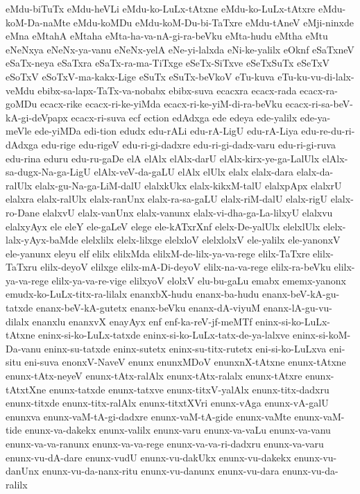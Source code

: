{eMdu-biTuTx
eMdu-heVLi
eMdu-ko-LuLx-tAtxne
eMdu-ko-LuLx-tAtxre
eMdu-koM-Da-naMte
eMdu-koMDu
eMdu-koM-Du-bi-TaTxre
eMdu-tAneV
eMji-ninxde
eMna
eMtahA
eMtaha
eMta-ha-va-nA-gi-ra-beVku
eMta-hudu
eMtha
eMtu
eNeNxya
eNeNx-ya-vanu
eNeNx-yelA
eNe-yi-lalxda
eNi-ke-yalilx
eOknf
eSaTxneV
eSaTx-neya
eSaTxra
eSaTx-ra-ma-TiTxge
eSeTx-SiTxve
eSeTxSuTx
eSeTxV
eSoTxV
eSoTxV-ma-kakx-Lige
eSuTx
eSuTx-beVkoV
eTu-kuva
eTu-ku-vu-di-lalx-veMdu
ebibx-sa-lapx-TaTx-va-nobabx
ebibx-suva
ecacxra
ecacx-rada
ecacx-ra-goMDu
ecacx-rike
ecacx-ri-ke-yiMda
ecacx-ri-ke-yiM-di-ra-beVku
ecacx-ri-sa-beV-kA-gi-deVpapx
ecacx-ri-suva
ecf
ection
edAdxga
ede
edeya
ede-yalilx
ede-ya-meVle
ede-yiMDa
edi-tion
edudx
edu-rALi
edu-rA-LigU
edu-rA-Liya
edu-re-du-ri-dAdxga
edu-rige
edu-rigeV
edu-ri-gi-dadxre
edu-ri-gi-dadx-varu
edu-ri-gi-ruva
edu-rina
eduru
edu-ru-gaDe
elA
elAlx
elAlx-darU
elAlx-kirx-ye-ga-LalUlx
elAlx-sa-dugx-Na-ga-LigU
elAlx-veV-da-gaLU
elAlx‌
elUlx
elalx
elalx-dara
elalx-da-ralUlx
elalx-gu-Na-ga-LiM-dalU
elalxkUkx
elalx-kikxM-talU
elalxpApx
elalxrU
elalxra
elalx-ralUlx
elalx-ranUnx
elalx-ra-sa-gaLU
elalx-riM-dalU
elalx-rigU
elalx-ro-Dane
elalxvU
elalx-vanUnx
elalx-vanunx
elalx-vi-dha-ga-La-lilxyU
elalxvu
elalxyAyx
ele
eleY
ele-gaLeV
elege
ele-kATxrXnf
elelx-De-yalUlx
elelxlUlx
elelx-lalx-yAyx-baMde
elelxlilx
elelx-lilxge
elelxloV
elelxlolxV
ele-yalilx
ele-yanonxV
ele-yanunx
eleyu
elf
elilx
elilxMda
elilxM-de-lilx-ya-va-rege
elilx-TaTxre
elilx-TaTxru
elilx-deyoV
elilxge
elilx-mA-Di-deyoV
elilx-na-va-rege
elilx-ra-beVku
elilx-ya-va-rege
elilx-ya-va-re-vige
elilxyoV
elolxV
elu-bu-gaLu
emabx
ememx-yanonx
emudx-ko-LuLx-titx-ra-lilalx
enanxbX-hudu
enanx-ba-hudu
enanx-beV-kA-gu-tatxde
enanx-beV-kA-gutetx
enanx-beVku
enanx-dA-viyuM
enanx-lA-gu-vu-dilalx
enanxlu
enanxvX
enayAyx
enf
enf-ka-reV-jf-meMTf
eninx-si-ko-LuLx-tAtxne
eninx-si-ko-LuLx-tatxde
eninx-si-ko-LuLx-tatx-de-ya-lalxve
eninx-si-koM-Da-vanu
eninx-su-tatxde
eninx-sutetx
eninx-su-titx-rutetx
eni-si-ko-LuLxva
eni-situ
eni-suva
enonxV-NaveV
enunx
enunxMDoV
enunxnX-tAtxne
enunx-tAtxne
enunx-tAtx-neyeV
enunx-tAtx-ralAlx
enunx-tAtx-ralalx
enunx-tAtxre
enunx-tAtxtXne
enunx-tatxde
enunx-tatxve
enunx-titxV-yalAlx
enunx-titx-dadxru
enunx-titxde
enunx-titx-ralAlx
enunx-titxtXVri
enunx-vAga
enunx-vA-galU
enunxva
enunx-vaM-tA-gi-dadxre
enunx-vaM-tA-gide
enunx-vaMte
enunx-vaM-tide
enunx-va-dakekx
enunx-valilx
enunx-varu
enunx-va-vaLu
enunx-va-vanu
enunx-va-va-ranunx
enunx-va-va-rege
enunx-va-va-ri-dadxru
enunx-va-varu
enunx-vu-dA-dare
enunx-vudU
enunx-vu-dakUkx
enunx-vu-dakekx
enunx-vu-danUnx
enunx-vu-da-nanx-ritu
enunx-vu-danunx
enunx-vu-dara
enunx-vu-da-ralilx
}
